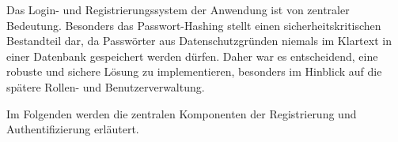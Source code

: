 Das Login- und Registrierungssystem der Anwendung ist von zentraler Bedeutung. Besonders das Passwort-Hashing stellt einen sicherheitskritischen Bestandteil dar, da Passwörter aus Datenschutzgründen niemals im Klartext in einer Datenbank gespeichert werden dürfen. Daher war es entscheidend, eine robuste und sichere Lösung zu implementieren, besonders im Hinblick auf die spätere Rollen- und Benutzerverwaltung.

\vspace{1em}
Im Folgenden werden die zentralen Komponenten der Registrierung und Authentifizierung erläutert.